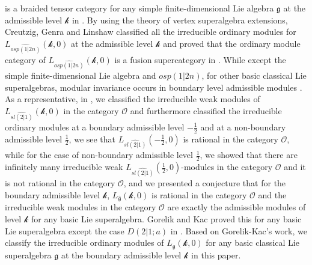\documentclass[12pt]{article}
\begin{document}
is a braided tensor category for any simple finite-dimensional Lie algebra $\mathfrak{g}$ at the admissible level $\mathcal{k}$ in \cite{CHY18}.
By using the theory of vertex superalgebra extensions,
Creutzig, Genra and Linshaw classified all the irreducible ordinary modules for $L_{\widehat{osp(1|2n)}}(\mathcal{k},0)$ at the admissible level $\mathcal{k}$
and proved that the ordinary module category of $L_{\widehat{osp(1|2n)}}(\mathcal{k},0)$ is a fusion supercategory in \cite{CGL24}.
While except the simple finite-dimensional Lie algebra and $osp(1|2n)$,
for other basic classical Lie superalgebras,
modular invariance occurs in boundary level admissible modules \cite{GK15,KW17}.
As a representative, in \cite{LW25}, we classified the irreducible weak modules of $L_{\widehat{sl(2|1)}}(\mathcal{k},0)$ in the category $\mathcal{O}$
and furthermore classified the irreducible ordinary modules at a boundary admissible level $-\frac{1}{2}$ and at a non-boundary admissible level $\frac{1}{2}$,
we see that $L_{\widehat{sl(2|1)}}(-\frac{1}{2},0)$ is rational in the category $\mathcal{O}$,
while for the case of non-boundary admissible level $\frac{1}{2}$, we showed that there are infinitely many irreducible weak
$L_{\widehat{sl(2|1)}}(\frac{1}{2},0)$-modules in the category $\mathcal{O}$ and it is not rational in the category $\mathcal{O}$,
and we presented a conjecture that for the boundary admissible level $\mathcal{k}$, $L_{\widehat{\mathfrak{g}}}(\mathcal{k},0)$
is rational in the category $\mathcal{O}$ and the irreducible weak modules in the category $\mathcal{O}$ are exactly the admissible modules of level $\mathcal{k}$
for any basic Lie superalgebra.
Gorelik and Kac proved this for any basic Lie superalgebra except the case $D(2|1;a)$ in \cite{GK25}.
Based on Gorelik-Kac's work, we classify the irreducible ordinary modules of $L_{\mathfrak{g}}(\mathcal{k},0)$ for any basic classical Lie superalgebra $\mathfrak{g}$ at the boundary admissible level $\mathcal{k}$ in this paper.
\end{document}
